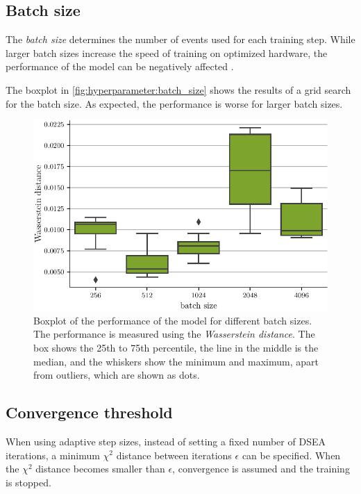 \subsection{Batch size}
The \emph{batch size} determines the number of events used for each training step.
While larger batch sizes increase the speed of training
on optimized hardware,
the performance of the model can be negatively affected \cite{batchsize_kandel}.

The boxplot in \autoref{fig:hyperparameter:batch_size} shows the results of a grid search for the batch size.
As expected, the performance is worse for larger batch sizes.

\begin{figure}
  \centering
  \includegraphics[scale=1]{content/plots/hyperparam/batch_size_vs_wd_boxplot_full.pdf}
  \caption{Boxplot of the performance of the model for different batch sizes.
    The performance is measured using the \emph{Wasserstein distance}.
    The box shows the 25th to 75th percentile,
    the line in the middle is the median,
    and the whiskers show the minimum and maximum,
      apart from outliers,
        which are shown as dots.
  }
  \label{fig:hyperparameter:batch_size}
\end{figure}


\subsection{Convergence threshold}
When using adaptive step sizes,
instead of setting a fixed number of DSEA iterations,
a minimum $\chi^2$ distance between iterations $\epsilon$
can be specified.
When the $\chi^2$ distance becomes smaller than $\epsilon$,
convergence is assumed and the training is stopped.

